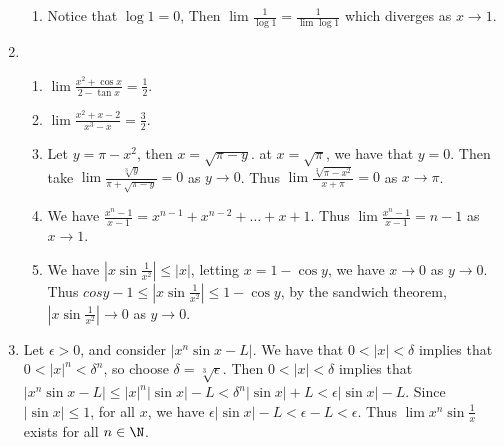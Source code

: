 \begin{enumerate}[label=(\arabic*)]
\begin{enumerate}
        \item Notice that  $\log{1}=0$, Then  $\lim{\frac{1}{\log{1}}}=\frac{1}{\lim{\log{1}}}$ 
            which diverges as $x \rightarrow 1$.
        \end{enumerate}

    \item
        \begin{enumerate}
            \item $\lim{\frac{x^2+\cos{x}}{2-\tan{x}}}=\frac{1}{2}$.

            \item $\lim{\frac{x^2+x-2}{x^3-x}}=\frac{3}{2}$.

            \item Let $y=\pi-x^2$, then  $x=\sqrt{\pi-y}$. at  $x=\sqrt{\pi}$, we have 
                that  $y=0$. Then take  $\lim{\frac{\sqrt[3]{y}}{\pi+\sqrt{\pi-y}}}=0$ as 
                $y \rightarrow 0$. Thus  $\lim{\frac{\sqrt[3]{\pi-x^2}}{x+\pi}}=0$ as 
                $x \rightarrow \pi$.

            \item We have  $ \frac{x^n-1}{x-1}=x^{n-1}+x^{n-2}+\dots+x+1$. Thus 
                $\lim{\frac{x^n-1}{x-1}}=n-1$ as $x \rightarrow 1$.

            \item We have $|x\sin{\frac{1}{x^2}}| \leq |x|$, letting $x=1-\cos{y}$, we 
                have  $x \rightarrow 0$ as  $y \rightarrow 0$. Thus  $cos{y}-1 \leq 
                |x\sin{\frac{1}{x^2}}| \leq 1-\cos{y}$, by the sandwich theorem, $|x\sin{\frac{1}{x^2}}| 
                \rightarrow 0$ as $y \rightarrow 0$.
        \end{enumerate}

    \item Let $\epsilon>0$, and consider  $|x^n\sin{x}-L|$.  We have that  $0<|x|<\delta$ 
        implies that  $0<|x|^n<\delta^n$, so choose  $\delta=\sqrt[3]{\epsilon}$. Then $0<|x|<\delta$ 
        implies that  $|x^n\sin{x}-L| \leq |x|^n|\sin{x}|-L<\delta^n|\sin{x}|+L<\epsilon|\sin{x}|-L$. 
        Since  $|\sin{x}| \leq 1$, for all  $x$, we have $\epsilon|\sin{x}|-L<\epsilon-L<\epsilon$. Thus 
        $\lim{x^n\sin{\frac{1}{x}}}$ exists for all $n \in \N$.
\end{enumerate}

